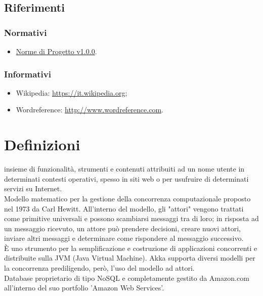 \documentclass{scalatekids-article}
\begin{document}
\subsection{Riferimenti} 
\subsubsection{Normativi}
\begin{itemize}
	\item \href{run:NormeDiProgetto\_v1.0.0.pdf}{Norme di Progetto v1.0.0}.
\end{itemize}
\subsubsection{Informativi}
\begin{itemize}
	\item Wikipedia: \url{https://it.wikipedia.org};
	\item Wordreference: \url{http://www.wordreference.com}.
\end{itemize}
\newpage
\section{Definizioni}
 insieme di funzionalità, strumenti e contenuti attribuiti ad un nome utente in determinati contesti operativi, spesso in siti web o per usufruire di determinati servizi su Internet.
\\

 Modello matematico per la gestione della concorrenza computazionale proposto nel 1973 da Carl Hewitt.
All'interno del modello, gli "attori" vengono trattati come primitive universali e possono scambiarsi messaggi tra di loro; in risposta ad un messaggio ricevuto, un attore può prendere decisioni, creare nuovi attori, inviare altri messaggi e determinare come rispondere al messaggio successivo.
\\

 È uno strumento per la semplificazione e costruzione di applicazioni concorrenti e distribuite sulla JVM (Java Virtual Machine). Akka supporta diversi modelli per la concorrenza prediligendo, però, l'uso del modello ad attori.
\\

 Database proprietario di tipo NoSQL e completamente gestito da Amazon.com all'interno del suo portfolio 'Amazon Web Services'.
\\
\end{document}
